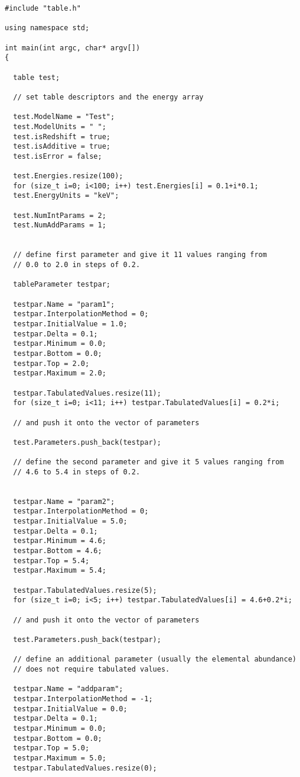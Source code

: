 \documentclass[11pt]{book}
\begin{document}
\begin{verbatim}
#include "table.h"

using namespace std;

int main(int argc, char* argv[])
{

  table test;

  // set table descriptors and the energy array

  test.ModelName = "Test";
  test.ModelUnits = " ";
  test.isRedshift = true;
  test.isAdditive = true;
  test.isError = false;

  test.Energies.resize(100);
  for (size_t i=0; i<100; i++) test.Energies[i] = 0.1+i*0.1;
  test.EnergyUnits = "keV";

  test.NumIntParams = 2;
  test.NumAddParams = 1;


  // define first parameter and give it 11 values ranging from
  // 0.0 to 2.0 in steps of 0.2.

  tableParameter testpar;

  testpar.Name = "param1";
  testpar.InterpolationMethod = 0;
  testpar.InitialValue = 1.0;
  testpar.Delta = 0.1;
  testpar.Minimum = 0.0;
  testpar.Bottom = 0.0;
  testpar.Top = 2.0;
  testpar.Maximum = 2.0;

  testpar.TabulatedValues.resize(11);
  for (size_t i=0; i<11; i++) testpar.TabulatedValues[i] = 0.2*i;

  // and push it onto the vector of parameters

  test.Parameters.push_back(testpar);

  // define the second parameter and give it 5 values ranging from
  // 4.6 to 5.4 in steps of 0.2.


  testpar.Name = "param2";
  testpar.InterpolationMethod = 0;
  testpar.InitialValue = 5.0;
  testpar.Delta = 0.1;
  testpar.Minimum = 4.6;
  testpar.Bottom = 4.6;
  testpar.Top = 5.4;
  testpar.Maximum = 5.4;

  testpar.TabulatedValues.resize(5);
  for (size_t i=0; i<5; i++) testpar.TabulatedValues[i] = 4.6+0.2*i;

  // and push it onto the vector of parameters

  test.Parameters.push_back(testpar);

  // define an additional parameter (usually the elemental abundance)
  // does not require tabulated values.

  testpar.Name = "addparam";
  testpar.InterpolationMethod = -1;
  testpar.InitialValue = 0.0;
  testpar.Delta = 0.1;
  testpar.Minimum = 0.0;
  testpar.Bottom = 0.0;
  testpar.Top = 5.0;
  testpar.Maximum = 5.0;
  testpar.TabulatedValues.resize(0);


\end{verbatim}
\end{document}

